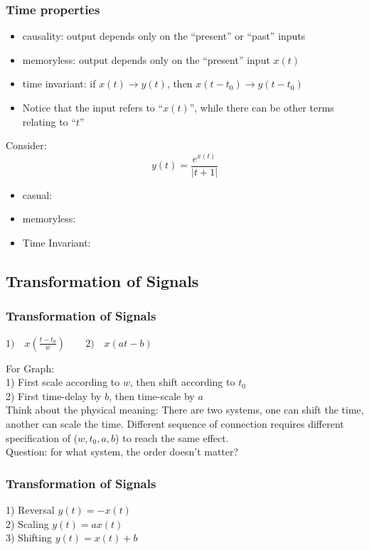 \documentclass{beamer}
\begin{document}
\begin{frame}[t]
\frametitle{Time properties}
\begin{itemize}
\item causality: output depends only on the ``present'' or ``past'' inputs
\item memoryless: output depends only on the ``present'' input $x(t)$
\item time invariant: if $x(t) \rightarrow y(t)$, then $x(t-t_0) \rightarrow y(t-t_0)$
\item Notice that the input refers to ``$x(t)$'', while there can be other terms relating to ``$t$'' 
\end{itemize}
Consider:
\[ y(t) = \frac{e^{x(t)}}{|t+1|} \]
\begin{itemize}
    \item casual:
    \item memoryless:
    \item Time Invariant:
\end{itemize}
\end{frame}

\subsection{Transformation of Signals}

\begin{frame}[t]
\frametitle{Transformation of Signals}
\begin{theorem}
$1) \quad x(\frac{t-t_0}{w}) \qquad 2) \quad x(at-b)$
\end{theorem}
For Graph: \\
1) First scale according to $w$, then shift according to $t_0$ \\
2) First time-delay by $b$, then time-scale by $a$ 
\newline \\
Think about the physical meaning: 
There are two systems, one can shift the time, another can scale the time. Different sequence of connection requires different specification of ($w, t_0, a, b$) to reach the same effect. 
\newline 
\\
\bigskip
Question: for what system, the order doesn't matter?
\end{frame}

\begin{frame}
    \frametitle{Transformation of Signals}
    \begin{theorem}
    1) Reversal $y(t) = -x(t) $ \\
    2) Scaling $y(t) = ax(t)$ \\
    3) Shifting $y(t) = x(t) + b $\\
    \end{theorem}  
\end{frame}
    
\end{document}
